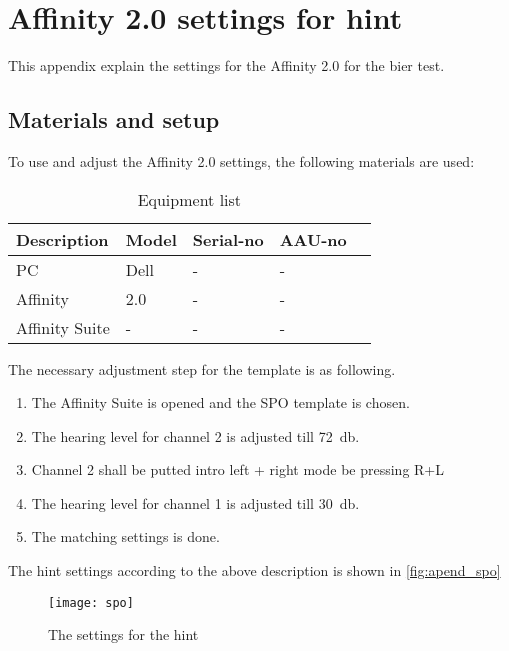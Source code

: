 \chapter*{Affinity 2.0 settings for \gls{hint}}
This appendix explain the settings for the Affinity 2.0 for the \gls{bier} test.

\section*{Materials and setup}
To use and adjust the Affinity 2.0 settings, the following materials are used:


\begin{table}[H]
\centering
\caption{Equipment list}
\begin{tabular}{l|l|l|l l}
Description         	& Model                                        & Serial-no  						& AAU-no \\ \hline
PC        			 		& Dell                                   & -  			& -  \\
Affinity     				& 2.0                            				& -   									& -  \\
Affinity Suite			& -                            				& -   									& - 
\end{tabular}
\end{table}

The necessary adjustment step for the template is as following.

\begin{enumerate}
\item The Affinity Suite is opened and the SPO template is chosen.
\item The hearing level for channel 2 is adjusted till \SI{72}{\decibel}.
\item  Channel 2 shall be putted intro left + right mode be pressing R+L
\item  The hearing level for channel 1 is adjusted till \SI{30}{\decibel}.
\item The matching settings is done.
\end{enumerate}

The \gls{hint} settings according to the above description is shown in \autoref{fig:apend_spo}



\begin{figure}[H]
	\centering
		\texttt{[image: spo]}
		\caption{The settings for the \gls{hint}}
		\label{fig:apend_spo}
\end{figure}

